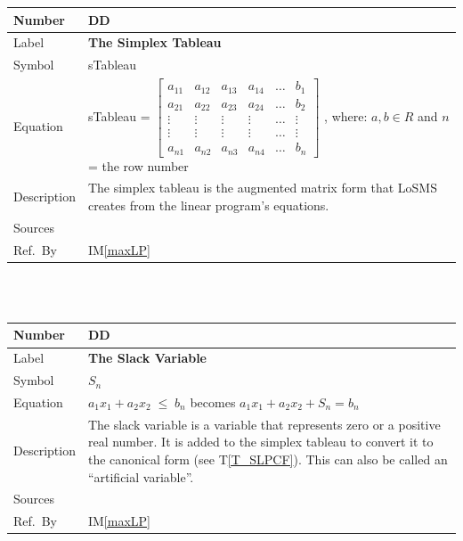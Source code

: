 \documentclass[12pt]{article}
\newcommand{\colAwidth}{0.13\textwidth}
\newcommand{\colBwidth}{0.82\textwidth}
\newcounter{defnum} %
\newcounter{datadefnum} %
\newcommand{\tref}[1]{T\ref{#1}}
\newcommand{\iref}[1]{IM\ref{#1}}
\newcommand{\famname}{LoSMS} %
\begin{document}
\noindent
\begin{minipage}{\textwidth}
	\renewcommand*{\arraystretch}{1.5}
	\begin{tabular}{| p{\colAwidth} | p{\colBwidth}|}
		\hline
		\rowcolor[gray]{0.9}
		Number& DD{datadefnum}\thedatadefnum 
		\label{simplexTableau}\\
		\hline
		Label& \bf The Simplex Tableau\\
		\hline
		Symbol & sTableau \\
		\hline
		Equation& sTableau = $\begin{bmatrix}
		a_{11} & a_{12} & a_{13} & a_{14} & \dots & b_{1}\\
		a_{21} & a_{22} & a_{23} & a_{24} & \dots & b_{2}\\
		\vdots & \vdots & \vdots & \vdots & \dots & \vdots\\
		\vdots & \vdots & \vdots & \vdots & \dots & \vdots\\
		a_{n1} & a_{n2} & a_{n3} & a_{n4} & \dots & b_{n}	
		\end{bmatrix}$ , where: $a, b \in R$ and $n$ = the row number\\
		\hline
		Description & 
		The simplex tableau is the augmented matrix form that \famname{} 
		creates from the linear program's equations.\\
		\hline
		Sources& \cite{lp-book}\\
		\hline
		Ref.\ By & \iref{maxLP}\\
		\hline
	\end{tabular}
\end{minipage}\\
~\newline

\noindent
\begin{minipage}{\textwidth}
	\renewcommand*{\arraystretch}{1.5}
	\begin{tabular}{| p{\colAwidth} | p{\colBwidth}|}
		\hline
		\rowcolor[gray]{0.9}
		Number& DD{datadefnum}\thedatadefnum 
		\label{slackVar}\\
		\hline
		Label& \bf The Slack Variable\\
		\hline
		Symbol & $S_n$\\
		\hline
		Equation& $a_1x_1 + a_2x_2\;{\leq}\;b_n$ becomes $a_1x_1 + a_2x_2 + S_n 
		= b_n$ \\
		\hline
		Description & 
		The slack variable is a variable that represents zero or a positive 
		real number. It is added to the simplex tableau to convert it to the 
		canonical form (see \tref{T_SLPCF}). This can also be called an 
		``artificial variable''.
		\\
		\hline
		Sources& \cite{lp-defs}\\
		\hline
		Ref.\ By & \iref{maxLP}\\
		\hline
	\end{tabular}
\end{minipage}\\
\end{document}

